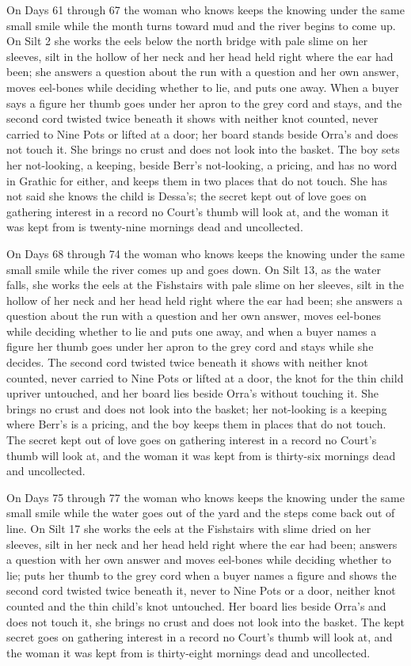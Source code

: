 \documentclass{design/chronicle}
\begin{document}
{On Days 61 through 67 the woman who knows keeps the knowing under the same small smile while the month turns toward mud and the river begins to come up. On Silt 2 she works the eels below the north bridge with pale slime on her sleeves, silt in the hollow of her neck and her head held right where the ear had been; she answers a question about the run with a question and her own answer, moves eel-bones while deciding whether to lie, and puts one away. When a buyer says a figure her thumb goes under her apron to the grey cord and stays, and the second cord twisted twice beneath it shows with neither knot counted, never carried to Nine Pots or lifted at a door; her board stands beside Orra’s and does not touch it. She brings no crust and does not look into the basket. The boy sets her not-looking, a keeping, beside Berr’s not-looking, a pricing, and has no word in Grathic for either, and keeps them in two places that do not touch. She has not said she knows the child is Dessa’s; the secret kept out of love goes on gathering interest in a record no Court’s thumb will look at, and the woman it was kept from is twenty-nine mornings dead and uncollected.

On Days 68 through 74 the woman who knows keeps the knowing under the same small smile while the river comes up and goes down. On Silt 13, as the water falls, she works the eels at the Fishstairs with pale slime on her sleeves, silt in the hollow of her neck and her head held right where the ear had been; she answers a question about the run with a question and her own answer, moves eel-bones while deciding whether to lie and puts one away, and when a buyer names a figure her thumb goes under her apron to the grey cord and stays while she decides. The second cord twisted twice beneath it shows with neither knot counted, never carried to Nine Pots or lifted at a door, the knot for the thin child upriver untouched, and her board lies beside Orra’s without touching it. She brings no crust and does not look into the basket; her not-looking is a keeping where Berr’s is a pricing, and the boy keeps them in places that do not touch. The secret kept out of love goes on gathering interest in a record no Court’s thumb will look at, and the woman it was kept from is thirty-six mornings dead and uncollected.

On Days 75 through 77 the woman who knows keeps the knowing under the same small smile while the water goes out of the yard and the steps come back out of line. On Silt 17 she works the eels at the Fishstairs with slime dried on her sleeves, silt in her neck and her head held right where the ear had been; answers a question with her own answer and moves eel-bones while deciding whether to lie; puts her thumb to the grey cord when a buyer names a figure and shows the second cord twisted twice beneath it, never to Nine Pots or a door, neither knot counted and the thin child’s knot untouched. Her board lies beside Orra’s and does not touch it, she brings no crust and does not look into the basket. The kept secret goes on gathering interest in a record no Court’s thumb will look at, and the woman it was kept from is thirty-eight mornings dead and uncollected.

}
\end{document}
